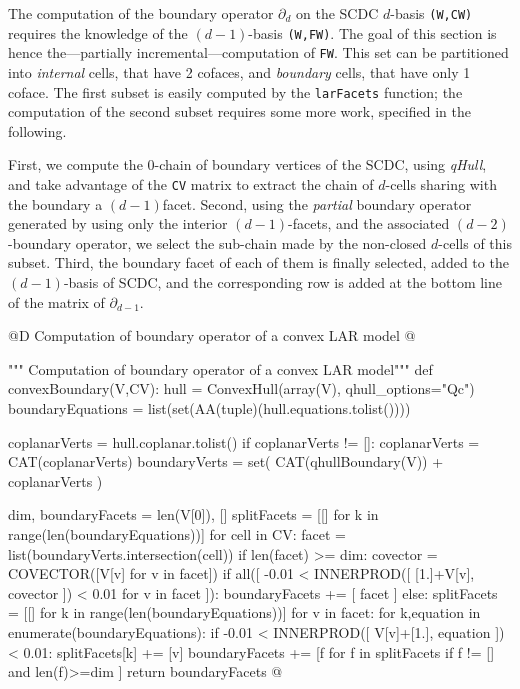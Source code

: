 \documentclass[11pt,oneside]{article}	%
\begin{document}
The computation of the boundary operator $\partial_d$ on the SCDC $d$-basis \texttt{(W,CW)} requires the knowledge of the $(d-1)$-basis \texttt{(W,FW)}. The goal of this section is hence the---partially incremental---computation of \texttt{FW}. This set can be partitioned into \emph{internal} cells, that have 2 cofaces, and \emph{boundary} cells, that have only 1 coface. The first subset is easily computed by the \texttt{larFacets} function; the computation of the second subset requires some more work, specified in the following.

First, we compute the 0-chain of boundary vertices of the SCDC, using \emph{qHull}, and take advantage of the \texttt{CV} matrix to extract the chain of $d$-cells sharing with the boundary a $(d-1)$facet. Second, using the \emph{partial} boundary operator generated by using only the interior $(d-1)$-facets, and the associated $(d-2)$-boundary operator, we select the sub-chain made by the non-closed $d$-cells of this subset. Third, the boundary facet of each of them is finally selected, added to the $(d-1)$-basis of SCDC, and the corresponding row is added at the bottom line of the matrix of $\partial_{d-1}$.

@D Computation of boundary operator of a convex LAR model
@{""" Computation of boundary operator of a convex LAR model"""
def convexBoundary(V,CV): 
	hull = ConvexHull(array(V), qhull_options="Qc")
	boundaryEquations = list(set(AA(tuple)(hull.equations.tolist())))
	
	coplanarVerts = hull.coplanar.tolist()
	if coplanarVerts != []:  coplanarVerts = CAT(coplanarVerts)
	boundaryVerts = set( CAT(qhullBoundary(V)) + coplanarVerts )
	
	dim, boundaryFacets = len(V[0]), []
	splitFacets = [[] for k in range(len(boundaryEquations))]
	for cell in CV:
		facet = list(boundaryVerts.intersection(cell))
		if len(facet) >= dim:
			covector = COVECTOR([V[v] for v in facet])
			if all([ -0.01 < INNERPROD([ [1.]+V[v], covector ]) < 0.01 for v in facet ]):
				boundaryFacets += [ facet ]
			else:
				splitFacets = [[] for k in range(len(boundaryEquations))]
				for v in facet:
					for k,equation in enumerate(boundaryEquations):
						if -0.01 < INNERPROD([ V[v]+[1.], equation ]) < 0.01:
							splitFacets[k] += [v]
			boundaryFacets += [f for f in splitFacets if f != [] and len(f)>=dim ]
	return boundaryFacets
@}
\end{document}
